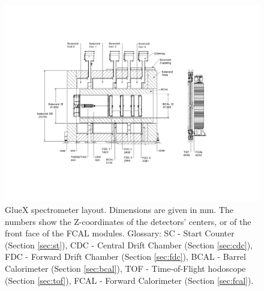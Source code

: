 \begin{figure}[tbp]
\centering
  \includegraphics[angle=0,viewport=95 115 628 500,clip,width=1.0\linewidth]{figures/gluex_spectrometer_drawing_01_bw}%
  \caption[layout]{GlueX spectrometer layout. Dimensions are given in mm. The
    numbers show the Z-coordinates of the detectors' centers, or of
    the front face of the FCAL modules.
    Glossary: 
              SC  - Start Counter (Section \ref{sec:st}), 
              CDC - Central Drift Chamber (Section \ref{sec:cdc}), 
              FDC - Forward Drift Chamber (Section \ref{sec:fdc}),
              BCAL - Barrel Calorimeter (Section \ref{sec:bcal}), 
              TOF -  Time-of-Flight hodoscope (Section \ref{sec:tof}), 
              FCAL - Forward Calorimeter (Section \ref{sec:fcal}).
%
    \label{fig:layout_spectrometer}
  }
\end{figure}

